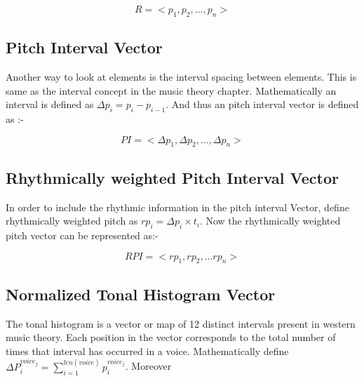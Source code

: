 \begin{equation}
R = <p_1, p_2, ..., p_n>
\end{equation}

\subsection{Pitch Interval Vector}

\noindent Another way to look at elements is the interval spacing between elements. This is same as the interval concept in the music theory chapter. Mathematically an interval is defined as $\Delta p_i = p_i - p_{i-1}$. And thus an pitch interval vector is defined as :-

\begin{equation}
PI = <\Delta p_1, \Delta p_2, ... , \Delta p_n>
\end{equation}

\subsection{Rhythmically weighted Pitch Interval Vector}

\noindent In order to include the rhythmic information in the pitch interval Vector, define rhythmically weighted pitch as $rp_i = \Delta p_i \times t_i$. Now the rhythmically weighted pitch vector can be represented as:-

\begin{equation}
RPI = <rp_1, rp_2, ... rp_n>
\end{equation}

\subsection{Normalized Tonal Histogram Vector}

\noindent The tonal histogram is a vector or map of 12 distinct intervals present in western music theory. Each position in the vector corresponds to the total number of times that interval has occurred in a voice. Mathematically define $\Delta P_i^{voice_j} = \sum_{i=1}^{len(voice)} p_i^{voice_j}$. Moreover 
